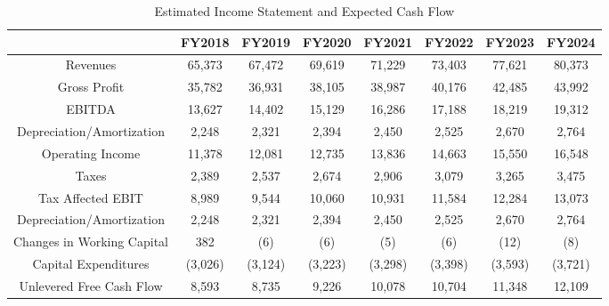 \begin{table}[ht]
\centering
\begin{tabular}{@{}cccccccc@{}}
\toprule
                           & FY2018  & FY2019  & FY2020  & FY2021  & FY2022  & FY2023  & FY2024  \\ \midrule
Revenues                   & 65,373  & 67,472  & 69,619  & 71,229  & 73,403  & 77,621  & 80,373  \\
Gross Profit               & 35,782  & 36,931  & 38,105  & 38,987  & 40,176  & 42,485  & 43,992  \\
EBITDA                     & 13,627  & 14,402  & 15,129  & 16,286  & 17,188  & 18,219  & 19,312  \\
Depreciation/Amortization  & 2,248   & 2,321   & 2,394   & 2,450   & 2,525   & 2,670   & 2,764   \\
Operating Income           & 11,378  & 12,081  & 12,735  & 13,836  & 14,663  & 15,550  & 16,548  \\
Taxes                      & 2,389   & 2,537   & 2,674   & 2,906   & 3,079   & 3,265   & 3,475   \\
Tax Affected EBIT          & 8,989   & 9,544   & 10,060  & 10,931  & 11,584  & 12,284  & 13,073  \\ \midrule
Depreciation/Amortization  & 2,248   & 2,321   & 2,394   & 2,450   & 2,525   & 2,670   & 2,764   \\
Changes in Working Capital & 382     & (6)     & (6)     & (5)     & (6)     & (12)    & (8)     \\
Capital Expenditures       & (3,026) & (3,124) & (3,223) & (3,298) & (3,398) & (3,593) & (3,721) \\ \midrule
Unlevered Free Cash Flow   & 8,593   & 8,735   & 9,226   & 10,078  & 10,704  & 11,348  & 12,109  \\ \bottomrule
\end{tabular}
\caption{Estimated Income Statement and Expected Cash Flow}
\label{tab:part1-expectedcf}
\end{table}

